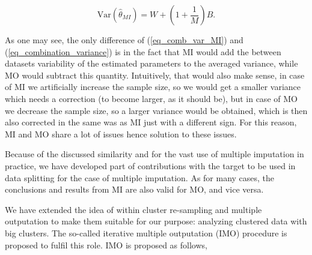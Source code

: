 \documentclass[11pt,a5paper,twoside]{book}
\begin{document}
\begin{equation}
\label{eq_comb_var_MI}
\mathrm{Var}(\widehat{\theta}_{MI}) = W + (1 + \frac{1}{M}) B.
\end{equation}

As one may see, the only difference of (\ref{eq_comb_var_MI}) and (\ref{eq_combination_variance}) is in the fact that MI would add the between datasets variability of the estimated parameters to the averaged variance, while MO would subtract this quantity. Intuitively, that would also make sense, in case of MI we artificially increase the sample size, so we would get a smaller variance which needs a correction (to become larger, as it should be), but in case of MO we decrease the sample size, so a larger variance would be obtained, which is then also corrected in the same was as MI just with a different sign. For this reason, MI and MO share a lot of issues hence solution to these issues.

Because of the discussed similarity and for the vast use of multiple imputation in practice, we have developed part of contributions with the target to be used in data splitting for the case of multiple imputation. As for many cases, the conclusions and results from MI are also valid for MO, and vice versa. 

We have extended the idea of within cluster re-sampling and multiple outputation to make them suitable for our purpose: analyzing clustered data with big clusters. The so-called iterative multiple outputation (IMO) procedure is proposed to fulfil this role. IMO is proposed as follows,
\end{document}
